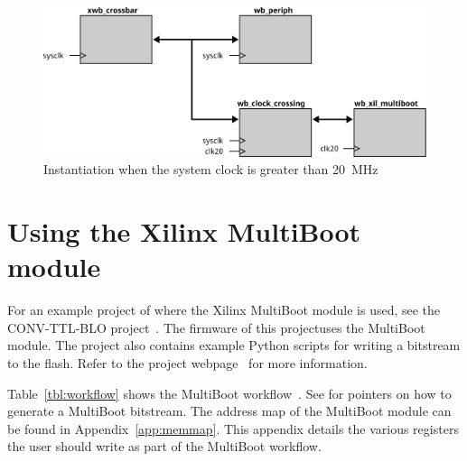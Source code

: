 \documentclass[a4paper,11pt]{article}
\newcounter{rownr}
\begin{document}
\begin{figure}
  \centerline{\includegraphics[width=\textwidth]{fig/inst-clkcross}}
  \caption{Instantiation when the system clock is greater than 20~MHz}
  \label{fig:inst-clkcross}
\end{figure}

\pagebreak
\section{Using the Xilinx MultiBoot module}
\label{sec:using}

For an example project of where the Xilinx MultiBoot module is used, see the
CONV-TTL-BLO project~\cite{ctb-proj}. The firmware of this projectuses the MultiBoot
module. The project also contains example Python scripts for writing a bitstream to
the flash. Refer to the project webpage~\cite{ctb-proj} for more information.

Table~\ref{tbl:workflow} shows the MultiBoot workflow~\cite{xtp059}. See \cite{gen-bitstream}
for pointers on how to generate a MultiBoot bitstream. The address map of the MultiBoot module
can be found in Appendix~\ref{app:memmap}. This appendix details the various registers the
user should write as part of the MultiBoot workflow.

\setcounter{rownr}{0}
\end{document}
